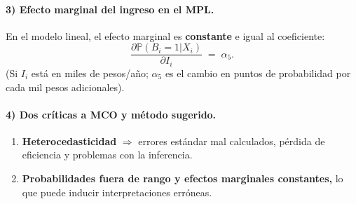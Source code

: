\documentclass[12pt]{article}
\begin{document}
\paragraph{3) Efecto marginal del ingreso en el MPL.}
En el modelo lineal, el efecto marginal es \textbf{constante} e igual al coeficiente:
\[
\frac{\partial \mathbb{P}(B_i=1|X_i)}{\partial I_i} \;=\; \alpha_5.
\]
(Si \(I_i\) está en miles de pesos/año; \(\alpha_5\) es el cambio en puntos de probabilidad por cada mil pesos adicionales).



\paragraph{4) Dos críticas a MCO y método sugerido.}
\begin{enumerate}
\item \textbf{Heterocedasticidad} \( \Rightarrow \) errores estándar mal calculados, pérdida de eficiencia y problemas con la inferencia. 
\item \textbf{Probabilidades fuera de rango y efectos marginales constantes,} lo que puede inducir interpretaciones erróneas.
\end{enumerate}
\end{document}
